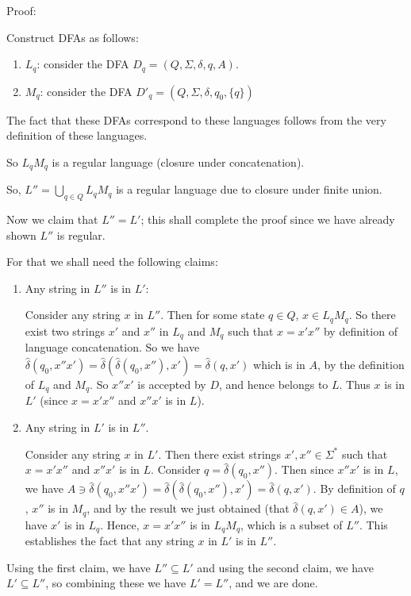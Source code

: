 \documentclass[answers]{exam}
\newcommand{\hd}{\hat{\delta}}
\begin{document}
\begin{questions}
\begin{solution}
        Proof:

        Construct DFAs as follows:
        
        \begin{enumerate}
            \item $L_q$: consider the DFA $D_q = (Q, \Sigma, \delta, q, A)$.
            \item $M_q$: consider the DFA $D'_q = (Q, \Sigma, \delta, q_0, \{q\})$
        \end{enumerate}

        The fact that these DFAs correspond to these languages follows from the very definition of these languages.

        So $L_q M_q$ is a regular language (closure under concatenation).

        So, $L'' =  \bigcup_{q \in Q} L_q M_q$ is a regular language due to closure under finite union.

        Now we claim that $L'' = L'$; this shall complete the proof since we have already shown $L''$ is regular.

        For that we shall need the following claims:

        \begin{enumerate}
            \item Any string in $L''$ is in $L'$:

                Consider any string $x$ in $L''$. Then for some state $q \in Q$, $x \in L_q M_q$. So there exist two strings $x'$ and $x''$ in $L_q$ and $M_q$ such that $x = x' x''$ by definition of
                language concatenation. So we have $\hd(q_0, x'' x') = \hd(\hd(q_0, x''), x') = \hd(q, x')$ which is in $A$, by the definition of $L_q$ and $M_q$. So $x'' x'$ is accepted by $D$, and
                hence belongs to $L$. Thus $x$ is in $L'$ (since $x = x' x''$ and $x'' x'$ is in $L$).

            \item Any string in $L'$ is in $L''$.

                Consider any string $x$ in $L'$. Then there exist strings $x', x'' \in \Sigma^*$ such that $x = x' x''$ and $x'' x'$ is in $L$. Consider $q = \hd(q_0, x'')$. Then since $x'' x'$ is in
                $L$, we have $A \ni \hd(q_0, x'' x') = \hd(\hd(q_0, x''), x') = \hd(q, x')$. By definition of $q$, $x''$ is in $M_q$, and by the result we just obtained (that $\hd(q, x') \in A$), we
                have $x'$ is in $L_q$. Hence, $x = x' x''$ is in $L_q M_q$, which is a subset of $L''$. This establishes the fact that any string $x$ in $L'$ is in $L''$.
        \end{enumerate}

        Using the first claim, we have $L'' \subseteq L'$ and using the second claim, we have $L' \subseteq L''$, so combining these we have $L' = L''$, and we are done.


    \end{solution}

\end{questions}
\end{document}
